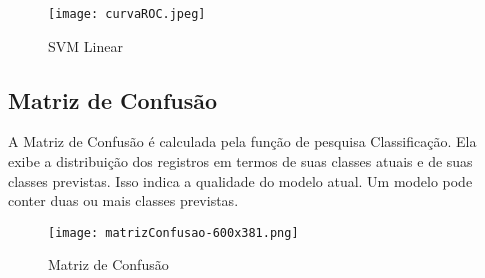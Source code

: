 \begin{figure}[!h]
    \centering
    \texttt{[image: curvaROC.jpeg]}
    \caption{SVM Linear}
\end{figure}


\subsection{Matriz de Confusão}
A Matriz de Confusão é calculada pela função de pesquisa Classificação. 
Ela exibe a distribuição dos registros em termos de suas classes atuais e de suas classes previstas. 
Isso indica a qualidade do modelo atual. Um modelo pode conter duas ou mais classes previstas.

\begin{figure}[!h]
    \centering
    \texttt{[image: matrizConfusao-600x381.png]}
    \caption{Matriz de Confusão}
\end{figure}